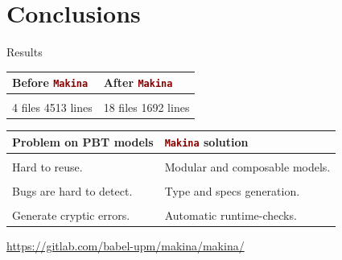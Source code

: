 \documentclass[aspectratio=169, 10pt]{beamer}
\begin{document}
\section{Conclusions}
\label{sec:org14f97a9}
\begin{frame}[label={sec:org5a6a7ff},fragile]{Results}
 \onslide<+->
\onslide<+->

\begin{center}
\begin{tabular}{ll}
Before \lstinline[language=elixir, style=display]~Makina~ & After \lstinline[language=elixir, style=display]~Makina~\\
\hline
 & \\
4 files 4513 lines & 18 files 1692 lines\\
\end{tabular}
\end{center}

\vspace{10pt}

\onslide<+->


\begin{center}
\begin{tabular}{ll}
Problem on PBT models & \lstinline[language=elixir, style=display]~Makina~ solution\\
\hline
 & \\
Hard to reuse. & Modular and composable models.\\
 & \\
Bugs are hard to detect. & Type and specs generation.\\
 & \\
Generate cryptic errors. & Automatic runtime-checks.\\
\end{tabular}
\end{center}

\vspace{10pt}
\begin{center}
\url{https://gitlab.com/babel-upm/makina/makina/}
\end{center}
\end{frame}
\end{document}

